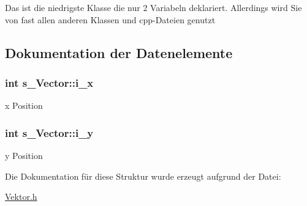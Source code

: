 Das ist die niedrigste Klasse die nur 2 Variabeln deklariert. Allerdings wird Sie von fast allen anderen Klassen und cpp-\/\-Dateien genutzt 

\subsection{Dokumentation der Datenelemente}
\hypertarget{structs___vector_a530003f44afc98b7ce7e51f77ef8f291}{
\subsubsection[{i\-\_\-x}]{\setlength{\rightskip}{0pt plus 5cm}int s\-\_\-\-Vector\-::i\-\_\-x}}\label{structs___vector_a530003f44afc98b7ce7e51f77ef8f291}


x Position 

\hypertarget{structs___vector_a13bd27672ca23d2302f5c24359f67ed2}{
\subsubsection[{i\-\_\-y}]{\setlength{\rightskip}{0pt plus 5cm}int s\-\_\-\-Vector\-::i\-\_\-y}}\label{structs___vector_a13bd27672ca23d2302f5c24359f67ed2}


y Position 



Die Dokumentation für diese Struktur wurde erzeugt aufgrund der Datei\-:\begin{DoxyCompactItemize}
\item 
\hyperlink{_vektor_8h}{Vektor.\-h}\end{DoxyCompactItemize}
